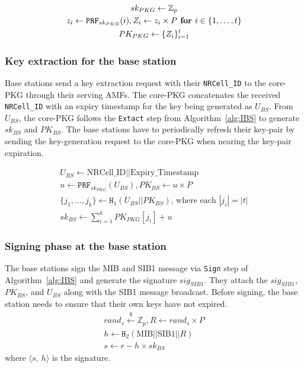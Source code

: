 \begin{gather*}
sk_{PKG} \gets \mathbb{Z}_p \\
z_i \gets \mathtt{PRF}_{sk_{PKG}}(i), Z_i \gets z_i \times P \textbf{ for } i\in \{1,\dots,t\} \\
PK_{PKG} \gets \{Z_i\}_{i=1}^t
\end{gather*}

\subsubsection{Key extraction for the base station}
\noindent Base stations send a key extraction request with their \texttt{NRCell\_ID} to the core-PKG through their serving AMFs. The core-PKG concatenates the received \texttt{NRCell\_ID} with an expiry timestamp for the key being generated as $U_{BS}$. From $U_{BS}$, the core-PKG follows the \texttt{Extact} step from Algorithm~\ref{alg:IBS} to generate $sk_{BS}$ and $PK_{BS}$. The base stations have to periodically refresh their key-pair by sending the key-generation request to the core-PKG when nearing the key-pair expiration. 

\begin{gather*}
U_{BS} \gets \text{NRCell\_ID} || \text{Expiry\_Timestamp} \\
u \gets \mathtt{PRF}_{sk_{PKG}}(U_{BS}), PK_{BS} \gets u \times P \\
\{j_1, ..., j_k\} \gets \mathtt{H}_1(U_{BS}||PK_{BS}) \text{, where each } |j_i|=|t| \\
sk_{BS} \gets \sum^k_{i=1}PK_{PKG}[j_i] + u
\end{gather*}

\subsubsection{Signing phase at the base station} 
The base stations sign the MIB and SIB1 message via \texttt{Sign} step of Algorithm~\ref{alg:IBS} and generate the signature $sig_{SIB1}$. They attach the $sig_{SIB1}$, $PK_{BS}$, and $U_{BS}$ along with the SIB1 message broadcast. Before signing, the base station needs to ensure that their own keys have not expired. \begin{gather*}
rand_s \stackrel{\$}{\leftarrow} \mathbb{Z}_p, R \gets rand_s \times P\\
h \gets \mathtt{H}_2(\text{MIB}||\text{SIB1}||R)\\
s \gets r - h \times sk_{BS}
\end{gather*}
where $\langle s,\ h \rangle$ is the signature.

